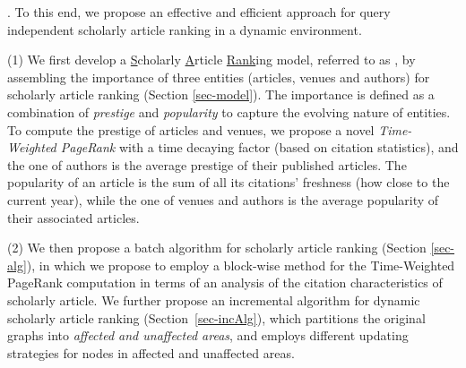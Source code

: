 .
To this end, we propose an effective and efficient approach for query independent scholarly article ranking in a dynamic environment.

\sstab(1) We first develop a \underline{S}cholarly \underline{A}rticle \underline{Rank}ing model, referred to as \ensemblerank, by assembling the importance of three entities (articles, venues and authors) for scholarly article ranking (Section \ref{sec-model}).
%
The importance is defined as a combination of {\em prestige} and {\em popularity} to capture the evolving nature of entities.
%
To compute the prestige of articles and venues, we propose a novel {\em Time-Weighted PageRank} with a time decaying factor (based on citation statistics), and the one of authors is the average prestige of their published articles.
%
The popularity of an article is the sum of all its citations' freshness (how close to the current year), while the one of venues and authors is the average popularity of their associated articles.
%


\sstab(2)  We then propose a batch algorithm for scholarly article ranking (Section \ref{sec-alg}), in which we propose to employ a block-wise method for the Time-Weighted PageRank computation in terms of an analysis of the citation characteristics of scholarly article.
%
We further propose an incremental algorithm for dynamic scholarly article ranking (Section~\ref{sec-incAlg}), which partitions the original graphs into  {\em affected and unaffected areas}, and employs different updating strategies for nodes in affected and unaffected areas.


%



